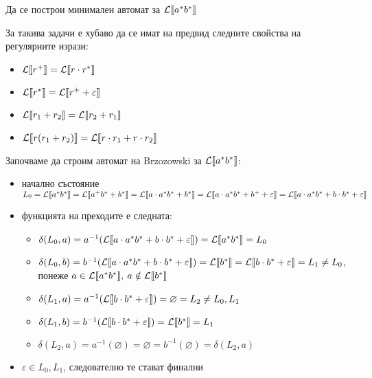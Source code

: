 \begin{problem}
Да се построи минимален автомат за $\mathcal{L}\llbracket a^*b^* \rrbracket$
\end{problem}

За такива задачи е хубаво да се имат на предвид следните свойства на регулярните изрази:
\begin{itemize}
    \item $\mathcal{L}\llbracket r^+ \rrbracket = \mathcal{L}\llbracket r \cdot r^* \rrbracket$
    \item $\mathcal{L}\llbracket r^* \rrbracket = \mathcal{L}\llbracket r^+ + \varepsilon \rrbracket$
    \item $\mathcal{L}\llbracket r_1 + r_2 \rrbracket = \mathcal{L}\llbracket r_2 + r_1 \rrbracket$
    \item $\mathcal{L}\llbracket r(r_1 + r_2) \rrbracket = \mathcal{L}\llbracket r \cdot r_1 + r \cdot r_2 \rrbracket$
\end{itemize}

Започваме да строим автомат на Brzozowski за $\mathcal{L}\llbracket a^*b^* \rrbracket$:
\begin{itemize}
    \item начално състояние $L_0 = \mathcal{L}\llbracket a^*b^* \rrbracket = \mathcal{L}\llbracket a^+b^* + b^* \rrbracket = \mathcal{L}\llbracket a \cdot a^*b^* + b^* \rrbracket = \mathcal{L}\llbracket a \cdot a^*b^* + b^+ + \varepsilon \rrbracket = \mathcal{L}\llbracket a \cdot a^*b^* + b \cdot b^* + \varepsilon \rrbracket$
    \item функцията на преходите е следната:
          \begin{itemize}
              \item $\delta(L_0, a) = a^{-1}(\mathcal{L}\llbracket a \cdot a^*b^* + b \cdot b^* + \varepsilon \rrbracket) = \mathcal{L}\llbracket a^*b^* \rrbracket = L_0$
              \item $\delta(L_0, b) = b^{-1}(\mathcal{L}\llbracket a \cdot a^*b^* + b \cdot b^* + \varepsilon \rrbracket) = \mathcal{L}\llbracket b^* \rrbracket = \mathcal{L}\llbracket b \cdot b^* + \varepsilon \rrbracket= L_1 \neq L_0$, понеже $a \in \mathcal{L}\llbracket a^*b^* \rrbracket, \: a \notin \mathcal{L}\llbracket b^* \rrbracket$
              \item $\delta(L_1, a) = a^{-1}(\mathcal{L}\llbracket b \cdot b^* + \varepsilon \rrbracket) = \varnothing = L_2 \neq L_0, L_1$
              \item $\delta(L_1, b) = b^{-1}(\mathcal{L}\llbracket b \cdot b^* + \varepsilon \rrbracket) = \mathcal{L}\llbracket b^* \rrbracket = L_1$
              \item $\delta(L_2, a) = a^{-1}(\varnothing) = \varnothing = b^{-1}(\varnothing) = \delta(L_2, a)$
          \end{itemize}
    \item $\varepsilon \in L_0, L_1$, следователно те стават финални
\end{itemize}

